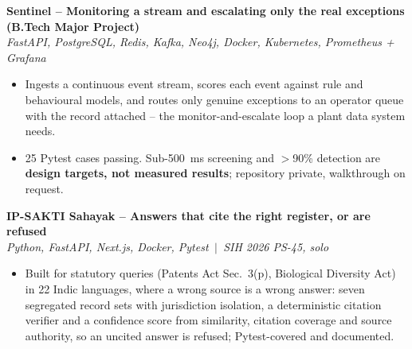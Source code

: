 \documentclass[letterpaper,11pt]{article}
\begin{document}
\vspace{1pt}
\textbf{Sentinel -- Monitoring a stream and escalating only the real exceptions (B.Tech Major Project)} \\
\hspace*{0.15in}\textit{FastAPI, PostgreSQL, Redis, Kafka, Neo4j, Docker, Kubernetes, Prometheus + Grafana}
\begin{itemize}[leftmargin=0.32in,labelsep=0.45em,itemsep=1pt,topsep=2pt,partopsep=0pt,parsep=0pt]
  \item Ingests a continuous event stream, scores each event against rule and behavioural models, and routes
        only genuine exceptions to an operator queue with the record attached -- the monitor-and-escalate
        loop a plant data system needs.
  \item 25 Pytest cases passing. Sub-500~ms screening and $>$90\% detection are \textbf{design targets, not
        measured results}; repository private, walkthrough on request.
\end{itemize}

\vspace{1pt}
\textbf{IP-SAKTI Sahayak -- Answers that cite the right register, or are refused} \\
\hspace*{0.15in}\textit{Python, FastAPI, Next.js, Docker, Pytest \,$|$\, SIH 2026 PS-45, solo}
\begin{itemize}[leftmargin=0.32in,labelsep=0.45em,itemsep=1pt,topsep=2pt,partopsep=0pt,parsep=0pt]
  \item Built for statutory queries (Patents Act Sec.~3(p), Biological Diversity Act) in 22 Indic languages,
        where a wrong source is a wrong answer: seven segregated record sets with jurisdiction isolation, a
        deterministic citation verifier and a confidence score from similarity, citation coverage and source
        authority, so an uncited answer is refused; Pytest-covered and documented.
\end{itemize}
\end{document}
